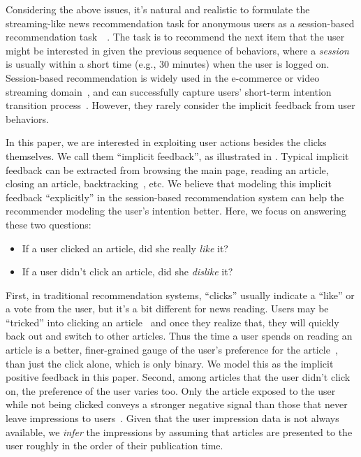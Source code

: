 Considering the above issues, it's natural and realistic to formulate the streaming-like news recommendation task for anonymous users as 
a session-based recommendation task~~\cite{sottocornola2018session,moreira_news_2018}. The task is to recommend the
next item that the user might be interested in given the previous sequence of behaviors, where a \textit{session} is usually within a short time (e.g., 30 minutes) when the user is logged on.
Session-based recommendation is widely used in the e-commerce or 
video streaming domain~\cite{xu2019time,pan2020star}, and can successfully capture
users' short-term intention transition process~\cite{epure_recommending_2017,symeonidis2020session}. However, they rarely consider the implicit feedback from user behaviors.

In this paper, we are interested in exploiting user actions besides the clicks themselves. We call them ``implicit feedback'', as
illustrated in . 
Typical implicit feedback can be extracted from browsing the main page, 
reading an article, closing an article, backtracking~\cite{smadja_understanding_2019}, etc. We believe that modeling
this implicit feedback ``explicitly'' in the session-based recommendation system 
can help the recommender modeling the user's intention better. Here, we focus on answering 
these two questions:
\begin{itemize}
    \item If a user clicked an article, did she really \textit{like} it? 
    \item If a user didn't click an article, did she \textit{dislike} it?
\end{itemize}

First, in traditional recommendation systems, ``clicks'' usually indicate a ``like'' or a
vote from the user, but it's a bit different for news reading. 
Users may be ``tricked'' into clicking an article~\cite{wang2020click} 
and once they realize that, they will quickly back out and switch to other articles. 
Thus the time a user spends on reading an article is a better, finer-grained gauge of the user's preference for the article~\cite{wu2020CPRS}, than just the click alone, which is only binary. We model this as the implicit positive feedback in this paper.
Second, among articles that the user didn't click on, the preference of the user varies too. Only the article exposed to the user while not being clicked 
conveys a stronger negative signal than those that never leave impressions to users~\cite{xie2020deep}.
Given that the user impression data is not always available, 
we \textit{infer} the impressions by assuming that articles are presented to the user roughly in the order of their publication time. 

